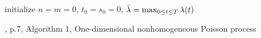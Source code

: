 \begin{algorithm}[H]

\SetAlgoLined
{}

initialize $n = m = 0$, $t_0 = s_0 = 0$, $\Bar{\lambda} = \max_{0 \leq t \leq T} \lambda(t)$\;
\caption{\cite{lewis1979simulation}, p.7, Algorithm 1, One-dimensional nonhomogeneous Poisson process}\label{algo:1d_inhomogenous_pp}
\end{algorithm}
